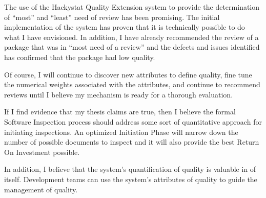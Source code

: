\documentclass[11pt,twocolumn]{article}
\begin{document}
The use of the Hackystat Quality Extension system to provide the
determination of ``most'' and ``least'' need of review has been promising.
The initial implementation of the system has proven that it is technically
possible to do what I have envisioned. In addition, I have already
recommended the review of a package that was in ``most need of a review''
and the defects and issues identified has confirmed that the package had
low quality.

Of course, I will continue to discover new attributes to define quality,
fine tune the numerical weights associated with the attributes, and
continue to recommend reviews until I believe my mechanism is ready for a
thorough evaluation.

If I find evidence that my thesis claims are true, then I believe the
formal Software Inspection process should address some sort of quantitative
approach for initiating inspections. An optimized Initiation Phase will
narrow down the number of possible documents to inspect and it will also
provide the best Return On Investment possible. 

In addition, I believe that the system's quantification of quality is
valuable in of itself. Development teams can use the system's attributes of
quality to guide the management of quality.



\end{document}
